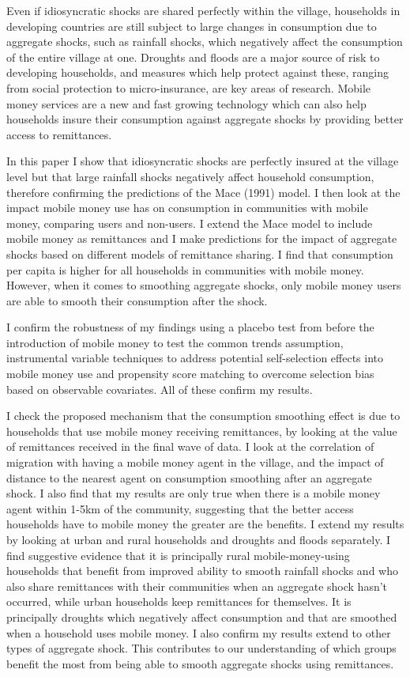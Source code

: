 Even if idiosyncratic shocks are shared perfectly within the village, households in developing countries are still subject to large changes in consumption due to aggregate shocks, such as rainfall shocks, which negatively affect the consumption of the entire village at one. Droughts and floods are a major source of risk to developing households, and measures which help protect against these, ranging from social protection to micro-insurance, are key areas of research. Mobile money services are a new and fast growing technology which can also help households insure their consumption against aggregate shocks by providing better access to remittances.

In this paper I show that idiosyncratic shocks are perfectly insured at the village level but that large rainfall shocks negatively affect household consumption, therefore confirming the predictions of the Mace (1991) model. I then look at the impact mobile money use has on consumption in communities with mobile money, comparing users and non-users. I extend the Mace model to include mobile money as remittances and I make predictions for the impact of aggregate shocks based on different models of remittance sharing. I find that consumption per capita is higher for all households in communities with mobile money. However, when it comes to smoothing aggregate shocks, only mobile money users are  able to smooth their consumption after the shock. 

I confirm the robustness of my findings using a placebo test from before the introduction of mobile money to test the common trends assumption, instrumental variable techniques to address potential self-selection effects into mobile money use and propensity score matching to overcome selection bias based on observable covariates. All of these confirm my results. 

I check the proposed mechanism that the consumption smoothing effect is due to households that use mobile money receiving remittances, by looking at the value of remittances received in the final wave of data. I look at the correlation of migration with having a mobile money agent in the village, and the impact of distance to the nearest agent on consumption smoothing after an aggregate shock. I also find that my results are only true when there is a mobile money agent within 1-5km of the community, suggesting that the better access households have to mobile money the greater are the benefits. I extend my results by looking at urban and rural households and droughts and floods separately. I find suggestive evidence that it is principally rural mobile-money-using households that benefit from improved ability to smooth rainfall shocks and who also share remittances with their communities when an aggregate shock hasn't occurred, while urban households keep remittances for themselves. It is principally droughts which negatively affect consumption and that are smoothed when a household uses mobile money. I also confirm my results extend to other types of aggregate shock. This contributes to our understanding of which groups benefit the most from being able to smooth aggregate shocks using remittances.   

